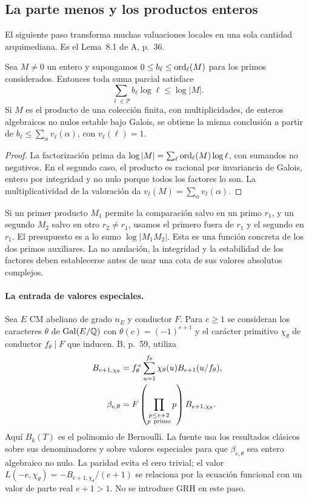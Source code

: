 \subsection{La parte menos y los productos enteros}

El siguiente paso transforma muchas valuaciones locales en
una sola cantidad arquimediana. Es el Lema~8.1 de A, p.~36.

\begin{lema}
\label{lem:cohom-producto}
Sea $M\ne0$ un entero y supongamos
$0\le b_\ell\le\operatorname{ord}_\ell(M)$ para los primos considerados.
Entonces toda suma parcial satisface
\[
 \sum_{\ell\in\mathcal P}b_\ell\log\ell\le\log|M|.
\]
Si $M$ es el producto de una colección finita, con
multiplicidades, de enteros algebraicos no nulos estable
bajo Galois, se obtiene la misma conclusión a partir
de $b_\ell\le\sum_\alpha v_\ell(\alpha)$, con
$v_\ell(\ell)=1$.
\end{lema}

\begin{proof}
La factorización prima da
$\log|M|=\sum_\ell\operatorname{ord}_\ell(M)\log\ell$, con sumandos
no negativos. En el segundo caso, el producto es racional
por invariancia de Galois, entero por integridad y no nulo
porque todos los factores lo son.
La multiplicatividad de la valoración da
$v_\ell(M)=\sum_\alpha v_\ell(\alpha)$.
\end{proof}

Si un primer producto $M_1$ permite la comparación salvo
en un primo $r_1$, y un segundo $M_2$ salvo en otro
$r_2\ne r_1$, usamos el primero fuera de $r_1$ y el segundo
en $r_1$. El presupuesto es a lo sumo $\log|M_1M_2|$.
Esta es una función concreta de los dos primos auxiliares.
La no anulación, la integridad y la estabilidad de los
factores deben establecerse antes de usar una cota de
sus valores absolutos complejos.

\paragraph{La entrada de valores especiales.}
Sea $E$ CM abeliano de grado $n_E$ y conductor $F$.
Para $e\ge1$ se consideran los caracteres $\theta$ de
$\operatorname{Gal}(E/\mathbb{Q})$ con
$\theta(c)=(-1)^{e+1}$ y el carácter primitivo
$\chi_\theta$ de conductor $f_\theta\mid F$ que inducen.
B, p.~59, utiliza
\begin{equation}
 \begin{aligned}
 B_{e+1,\chi_\theta}
   &=f_\theta^{\,e}\sum_{u=1}^{f_\theta}
       \chi_\theta(u)B_{e+1}(u/f_\theta),\\
 \beta_{e,\theta}
   &=F\left(\prod_{\substack{p\le e+2\\p\ {\rm primo}}}p\right)
        B_{e+1,\chi_\theta}.
 \end{aligned}
 \label{eq:cohom-bernoulli}
\end{equation}
Aquí $B_k(T)$ es el polinomio de Bernoulli.
La fuente usa los resultados clásicos sobre sus
denominadores y sobre valores especiales para que
$\beta_{e,\theta}$ sea entero algebraico no nulo.
La paridad evita el cero trivial; el valor
$L(-e,\chi_\theta)=-B_{e+1,\chi_\theta}/(e+1)$ se relaciona
por la ecuación funcional con un valor de parte real
$e+1>1$. No se introduce GRH en este paso.

